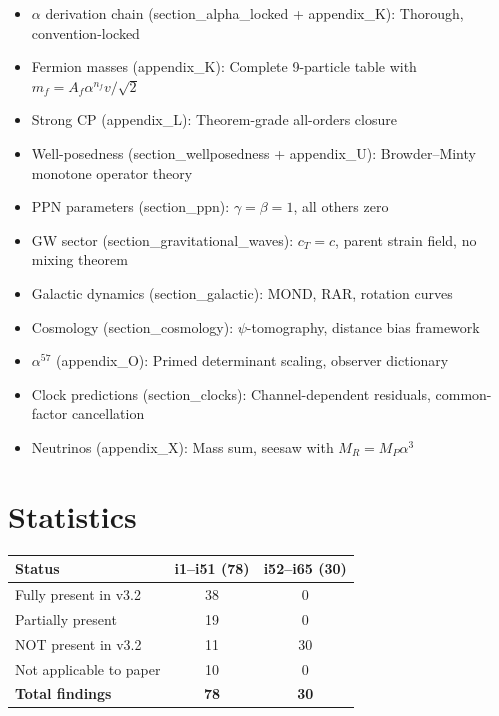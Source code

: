 \documentclass[11pt,a4paper]{article}
\begin{document}
\begin{tcolorbox}[colback=green!5!white, colframe=green!60!black, title=Well-Covered Areas]
\begin{itemize}
\item $\alpha$ derivation chain (section\_alpha\_locked + appendix\_K): Thorough, convention-locked
\item Fermion masses (appendix\_K): Complete 9-particle table with $m_f = A_f \alpha^{n_f} v/\sqrt{2}$
\item Strong CP (appendix\_L): Theorem-grade all-orders closure
\item Well-posedness (section\_wellposedness + appendix\_U): Browder--Minty monotone operator theory
\item PPN parameters (section\_ppn): $\gamma = \beta = 1$, all others zero
\item GW sector (section\_gravitational\_waves): $c_T = c$, parent strain field, no mixing theorem
\item Galactic dynamics (section\_galactic): MOND, RAR, rotation curves
\item Cosmology (section\_cosmology): $\psi$-tomography, distance bias framework
\item $\alpha^{57}$ (appendix\_O): Primed determinant scaling, observer dictionary
\item Clock predictions (section\_clocks): Channel-dependent residuals, common-factor cancellation
\item Neutrinos (appendix\_X): Mass sum, seesaw with $M_R = M_P \alpha^3$
\end{itemize}
\end{tcolorbox}

\section{Statistics}

\begin{center}
\begin{tabular}{lcc}
\toprule
\textbf{Status} & \textbf{i1--i51 (78)} & \textbf{i52--i65 (30)} \\
\midrule
Fully present in v3.2 & 38 & 0 \\
Partially present & 19 & 0 \\
NOT present in v3.2 & 11 & 30 \\
Not applicable to paper & 10 & 0 \\
\midrule
\textbf{Total findings} & \textbf{78} & \textbf{30} \\
\bottomrule
\end{tabular}
\end{center}
\end{document}
